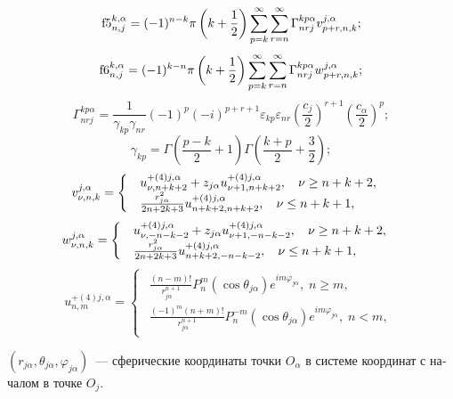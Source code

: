 \begin{russian}
\begin{theorem}
\[{\rm{f5}}_{n,j}^{k,\alpha } = (-1)^{n-k}\pi \left( {k + \frac{1}{2}} \right)\sum\limits_{p = k}^\infty  {\sum\limits_{r = n}^\infty  {\Gamma _{nrj}^{kp\alpha }v_{p + r,n,k}^{j,\alpha }} };\]
\[{\rm{f6}}_{n,j}^{k,\alpha } = (-1)^{k-n}\pi \left( {k + \frac{1}{2}} \right)\sum\limits_{p = k}^\infty  {\sum\limits_{r = n}^\infty  {\Gamma _{nrj}^{kp\alpha }w_{p + r,n,k}^{j,\alpha }} };\]
\[\Gamma _{nrj}^{kp\alpha } = \frac{1}{{{\gamma _{kp}}{\gamma _{nr}}}}{( - 1)^{p}}(-i)^{p+r+1}{\varepsilon _{kp}}{\varepsilon _{nr}}{\left( {\frac{{{{{c}}_j}}}{2}} \right)^{r + 1}}{\left( {\frac{{{{{c}}_\alpha }}}{2}} \right)^p};\]
\[{\gamma _{kp}} = \Gamma \left( {\frac{{p - k}}{2} + 1} \right)\Gamma \left( {\frac{{k + p}}{2} + \frac{3}{2}} \right);\]
\[v_{\nu ,n,k}^{j,\alpha } = \left\{ {\begin{array}{*{20}{l}}
\begin{array}{l}
u_{\nu ,n + k + 2}^{ + (4)j,\alpha } + {z_{j\alpha }}u_{\nu  + 1,n + k + 2}^{ + (4)j,\alpha },\;\;\;{\kern 1pt} \nu  \ge n + k + 2,\\
\frac{{r_{j\alpha }^2}}{{2n + 2k + 3}}u_{n + k + 2,n + k + 2}^{ + (4)j,\alpha },\;\;\;{\kern 1pt} \nu  \le n + k + 1,
\end{array}
\end{array}} \right.\]
\[w_{\nu ,n,k}^{j,\alpha } = \left\{ {\begin{array}{*{20}{l}}
\begin{array}{l}
u_{\nu , - n - k - 2}^{ + (4)j,\alpha } + {z_{j\alpha }}u_{\nu  + 1, - n - k - 2}^{ + (4)j,\alpha },\;\;\;{\kern 1pt} \nu  \ge n + k + 2,\\
\frac{{r_{j\alpha }^2}}{{2n + 2k + 3}}u_{n + k + 2, - n - k - 2}^{ + (4)j,\alpha },\;\;\;{\kern 1pt} \nu  \le n + k + 1,
\end{array}
\end{array}} \right.\]
\[{{u}}_{n,m}^{ + (4)j,\alpha } = \left\{ {\begin{array}{*{20}{l}}
\begin{array}{l}
\frac{{(n - m)!}}{{r_{j\alpha }^{n + 1}}}P_n^m(\cos {\theta _{j\alpha }}){e^{im{\varphi _{j\alpha }}}},\;n \ge m,\\
\frac{{{{( - 1)}^m}(n + m)!}}{{r_{j\alpha }^{n + 1}}}P_n^{ - m}(\cos {\theta _{j\alpha }}){e^{im{\varphi _{j\alpha }}}},\;n < m,
\end{array}
\end{array}} \right.\]

\noindent $(r_{j\alpha},\theta_{j\alpha},\varphi_{j\alpha})$~--- сферические координаты точки $O_\alpha$ в системе координат с началом в точке $O_j$.
\end{theorem}


\end{russian}
